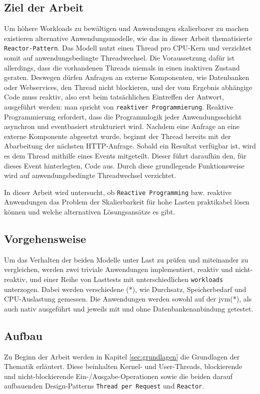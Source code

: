\subsection{Ziel der Arbeit}
\label{subsec:ziel}
Um höhere Workloads zu bewältigen und Anwendungen skalierbarer zu machen existieren alternative
Anwendungsmodelle, wie das in dieser Arbeit thematisierte \verb|Reactor-Pattern|.
Das Modell nutzt einen Thread pro CPU-Kern und verzichtet somit auf anwendungsbedingte Threadwechsel.
Die Voraussetzung dafür ist allerdings, dass die vorhandenen Threads niemals in einen inaktiven Zustand geraten.
Deswegen dürfen Anfragen an externe Komponenten, wie Datenbanken oder Webservices, den Thread nicht blockieren,
und der vom Ergebnis abhängige Code muss reaktiv, also erst beim tatsächlichen Eintreffen der Antwort,
ausgeführt werden: man spricht von \verb|reaktiver Programmierung|.
Reaktive Programmierung erfordert, dass die Programmlogik jeder
Anwendungsschicht asynchron und eventbasiert strukturiert wird.
Nachdem eine Anfrage an eine externe Komponente abgesetzt wurde, beginnt der Thread bereits mit der Abarbeitung der nächsten
HTTP-Anfrage. Sobald ein Resultat verfügbar ist, wird es dem Thread mithilfe eines Events mitgeteilt.
Dieser führt daraufhin den, für dieses Event hinterlegten, Code aus. Durch diese grundlegende Funktionsweise wird auf anwendungsbedingte
Threadwechsel verzichtet.

In dieser Arbeit wird untersucht, ob \verb|Reactive Programming| bzw. reaktive Anwendungen das Problem der Skalierbarkeit
für hohe Lasten praktikabel lösen können und welche alternativen Lösungsansätze es gibt.

\subsection{Vorgehensweise}
\label{subsec:vorgehensweise}
Um das Verhalten der beiden Modelle unter Last zu prüfen und miteinander zu vergleichen, werden zwei triviale Anwendungen implementiert,
reaktiv und nicht-reaktiv, und einer Reihe von Lasttests mit unterschiedlichen \verb|workloads| unterzogen.
Dabei werden verschiedene (*), wie Durchsatz, Speicherbedarf und CPU-Auslastung gemessen.
Die Anwendungen werden sowohl auf der \acrshort{jvm}(*), als auch nativ ausgeführt und jeweils mit und ohne Datenbankenanbindung getestet.

\subsection{Aufbau}
\label{subsec:aufbau}
Zu Beginn der Arbeit werden in Kapitel \ref{sec:grundlagen} die Grundlagen der Thematik erläutert. Diese beinhalten
Kernel- und User-Threads, blockierende und nicht-blockierende Ein-/Ausgabe-Operationen sowie die beiden darauf aufbauenden Design-Patterns
\verb|Thread per Request| und \verb|Reactor|.

